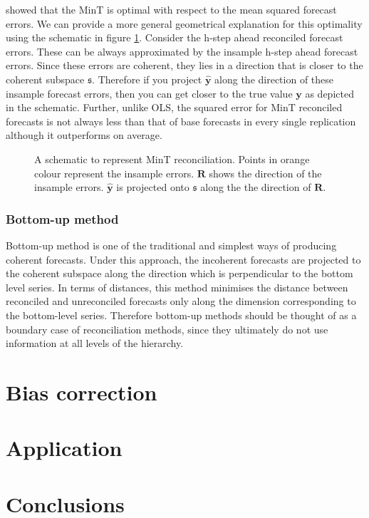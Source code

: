 \documentclass[12pt]{article}
\theoremstyle{definition}
\begin{document}
	\citet{Wickramasuriya2017} showed that the MinT is optimal with respect to the mean squared forecast errors. 
	We can provide a more general geometrical explanation for this optimality using the schematic in figure \ref{fig:MinT_justification}. Consider the h-step ahead reconciled forecast errors. These can be always approximated by the insample h-step ahead forecast errors. Since these errors are coherent, they lies in a direction that is closer to the coherent subspace $\mathfrak{s}$. Therefore if you project $\hat{\bm{y}}$ along the direction of these insample forecast errors, then you can get closer to the true value $\bm{y}$ as depicted in the schematic. Further, unlike OLS, the squared error for MinT reconciled forecasts is not always less than that of base forecasts in every single replication although it outperforms on average.


	 	
	 \begin{figure}[!b]
	 		\centering
	 		\small
	 		\resizebox{\linewidth}{!}{
	 			
	 		}
	 		\caption{A schematic to represent MinT reconciliation. Points in orange colour represent the insample errors. $\bm{R}$ shows the direction of the insample errors. $\hat{\bm{y}}$ is projected onto $\mathfrak{s}$ along the the direction of $\bm{R}$.}\label{fig:MinT_justification}
	 \end{figure}
	
	\subsubsection{Bottom-up method}
	
	Bottom-up method is one of the traditional and simplest ways of producing coherent forecasts. Under this approach, the incoherent forecasts are projected to the coherent subspace along the direction which is perpendicular to the bottom level series. In terms of distances, this method minimises the distance between reconciled and unreconciled forecasts only along the dimension corresponding to the bottom-level series. Therefore bottom-up methods should be thought of as a boundary case of reconciliation methods, since they ultimately do not use information at all levels of the hierarchy.   
	
	
	\section{Bias correction}
	
	\section{Application}
	
	\section{Conclusions}
	
	\newpage
	
	
	
	
	
\end{document}

